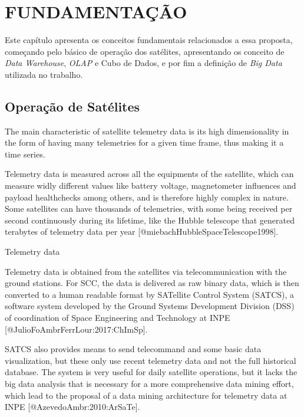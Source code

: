 
\chapter{FUNDAMENTAÇÃO}
\label{ch:fun}

{\color{red}
Este capítulo apresenta os conceitos fundamentais relacionados a essa proposta, começando pelo básico de operação dos satélites, apresentando os conceito de \textit{Data Warehouse}, \textit{OLAP} e Cubo de Dados, e por fim a definição de \textit{Big Data} utilizada no trabalho.
}

\section{Operação de Satélites}
\label{ch:fun:operations}

The main characteristic of satellite telemetry data is its high dimensionality in the form of having many telemetries for a given time frame, thus making it a time series.

Telemetry data is measured across all the equipments of the satellite, which can measure widly different values like battery voltage, magnetometer influences and payload healthchecks among others, and is therefore highly complex in nature.
Some satellites can have thousands of telemetries, with some being received per second continuously during its lifetime, like the Hubble telescope that generated terabytes of telemetry data per year [@miebachHubbleSpaceTelescope1998].

Telemetry data

Telemetry data is obtained from the satellites via telecommunication with the ground stations.
For SCC, the data is delivered as raw binary data, which is then converted to a human readable format by SATellite Control System (SATCS), a software system developed by the Ground Systems Development Division (DSS) of coordination of Space Engineering and Technology at INPE [@JulioFoAmbrFerrLour:2017:ChImSp].

SATCS also provides means to send telecommand and some basic data visualization, but these only use recent telemetry data and not the full historical database.
The system is very useful for daily satellite operations, but it lacks the big data analysis that is necessary for a more comprehensive data mining effort, which lead to the proposal of a data mining architecture for telemetry data at INPE [@AzevedoAmbr:2010:ArSaTe].

